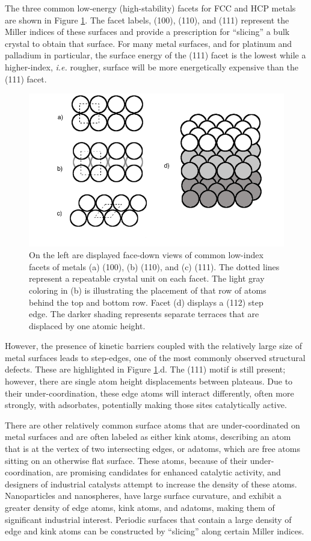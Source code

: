 The three common low-energy (high-stability) facets for FCC and HCP
metals are shown in Figure \ref{fig:facets}. The facet labels, (100),
(110), and (111) represent the Miller indices of these surfaces and provide a
prescription for ``slicing'' a bulk crystal to obtain that surface. For many
metal surfaces, and for platinum and palladium in particular, the surface energy of the
(111) facet is the lowest while a higher-index,
{\em i.e.} rougher, surface will be more energetically expensive than the (111) facet.

\begin{figure}[p!]
  \includegraphics[width=\linewidth]{../figures/chap1/facets.pdf}
  \caption{On the left are displayed face-down views of common low-index facets
of metals (a) (100), (b) (110), and (c) (111). The dotted lines represent a
repeatable crystal unit on each facet. The light gray coloring in (b) is
illustrating the placement of that row of atoms behind the top and bottom row.
Facet (d) displays a (112) step edge. The darker shading represents separate
terraces that are displaced by one atomic height.}
\label{fig:facets}
\end{figure}

However, the presence of kinetic barriers coupled with the relatively large
size of metal surfaces leads to step-edges, one of the most commonly observed
structural defects.  These are highlighted in Figure \ref{fig:facets}.d.  The
(111) motif is still present; however, there are single atom height
displacements between plateaus. Due to their under-coordination, these edge
atoms will interact differently, often more strongly, with adsorbates,
potentially making those sites catalytically active.

There are other relatively common surface atoms that are under-coordinated on
metal surfaces and are often labeled as either kink atoms, describing an atom
that is at the vertex of two intersecting edges, or adatoms, which are free
atoms sitting on an otherwise flat surface. These atoms, because of their
under-coordination, are promising candidates for enhanced catalytic activity,
and designers of industrial catalysts attempt to increase the density of these
atoms.  Nanoparticles and nanospheres, have large surface curvature, and
exhibit a greater density of edge atoms, kink atoms, and adatoms, making them
of significant industrial interest.  Periodic surfaces that contain a large
density of edge and kink atoms can be constructed by ``slicing'' along certain
Miller indices.


